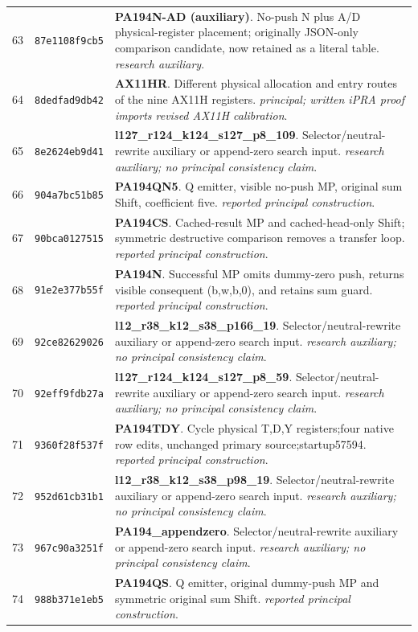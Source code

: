 \begin{longtable}{@{}r p{} p{}@{}}
63 & \texttt{87e1108f9cb5} & \textbf{PA194N-AD (auxiliary)}. No-push N plus A/D physical-register placement; originally JSON-only comparison candidate, now retained as a literal table. \emph{research auxiliary}.\\[3pt]
64 & \texttt{8dedfad9db42} & \textbf{AX11HR}. Different physical allocation and entry routes of the nine AX11H registers. \emph{principal; written iPRA proof imports revised AX11H calibration}.\\[3pt]
65 & \texttt{8e2624eb9d41} & \textbf{l127\_r124\_k124\_s127\_p8\_109}. Selector/neutral-rewrite auxiliary or append-zero search input. \emph{research auxiliary; no principal consistency claim}.\\[3pt]
66 & \texttt{904a7bc51b85} & \textbf{PA194QN5}. Q emitter, visible no-push MP, original sum Shift, coefficient five. \emph{reported principal construction}.\\[3pt]
67 & \texttt{90bca0127515} & \textbf{PA194CS}. Cached-result MP and cached-head-only Shift; symmetric destructive comparison removes a transfer loop. \emph{reported principal construction}.\\[3pt]
68 & \texttt{91e2e377b55f} & \textbf{PA194N}. Successful MP omits dummy-zero push, returns visible consequent (b,w,b,0), and retains sum guard. \emph{reported principal construction}.\\[3pt]
69 & \texttt{92ce82629026} & \textbf{l12\_r38\_k12\_s38\_p166\_19}. Selector/neutral-rewrite auxiliary or append-zero search input. \emph{research auxiliary; no principal consistency claim}.\\[3pt]
70 & \texttt{92eff9fdb27a} & \textbf{l127\_r124\_k124\_s127\_p8\_59}. Selector/neutral-rewrite auxiliary or append-zero search input. \emph{research auxiliary; no principal consistency claim}.\\[3pt]
71 & \texttt{9360f28f537f} & \textbf{PA194TDY}. Cycle physical T,D,Y registers;four native row edits, unchanged primary source;startup57594. \emph{reported principal construction}.\\[3pt]
72 & \texttt{952d61cb31b1} & \textbf{l12\_r38\_k12\_s38\_p98\_19}. Selector/neutral-rewrite auxiliary or append-zero search input. \emph{research auxiliary; no principal consistency claim}.\\[3pt]
73 & \texttt{967c90a3251f} & \textbf{PA194\_appendzero}. Selector/neutral-rewrite auxiliary or append-zero search input. \emph{research auxiliary; no principal consistency claim}.\\[3pt]
74 & \texttt{988b371e1eb5} & \textbf{PA194QS}. Q emitter, original dummy-push MP and symmetric original sum Shift. \emph{reported principal construction}.\\[3pt]

\end{longtable}
